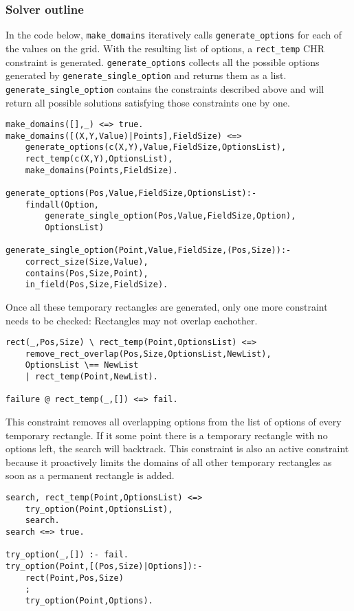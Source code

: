 \subsubsection{Solver outline}
In the code below,  \texttt{make\_domains} iteratively calls \texttt{generate\_options} for each of the values on the grid. With the resulting list of options, a \texttt{rect\_temp} CHR constraint is generated. \texttt{generate\_options} collects all the possible options generated by \texttt{generate\_single\_option} and returns them as a list. \texttt{generate\_single\_option} contains the constraints described above and will return all possible solutions satisfying those constraints one by one. 

\begin{lstlisting}
make_domains([],_) <=> true.
make_domains([(X,Y,Value)|Points],FieldSize) <=>
	generate_options(c(X,Y),Value,FieldSize,OptionsList),
	rect_temp(c(X,Y),OptionsList),
	make_domains(Points,FieldSize).
	
generate_options(Pos,Value,FieldSize,OptionsList):-
    findall(Option,
		generate_single_option(Pos,Value,FieldSize,Option),
		OptionsList)
		
generate_single_option(Point,Value,FieldSize,(Pos,Size)):-
	correct_size(Size,Value),
	contains(Pos,Size,Point),
	in_field(Pos,Size,FieldSize).
\end{lstlisting}

Once all these temporary rectangles are generated, only one more constraint needs to be checked: Rectangles may not overlap eachother.

\begin{lstlisting}
rect(_,Pos,Size) \ rect_temp(Point,OptionsList) <=>
	remove_rect_overlap(Pos,Size,OptionsList,NewList),
	OptionsList \== NewList
	| rect_temp(Point,NewList).
	
failure @ rect_temp(_,[]) <=> fail.

\end{lstlisting}


This constraint removes all overlapping options from the list of options of every temporary rectangle. If it some point there is a temporary rectangle with no options left, the search will backtrack. This constraint is also an active constraint because it proactively limits the domains of all other temporary rectangles as soon as a permanent rectangle is added.
\begin{lstlisting}
search, rect_temp(Point,OptionsList) <=>
	try_option(Point,OptionsList),
	search.
search <=> true.

try_option(_,[]) :- fail.
try_option(Point,[(Pos,Size)|Options]):-
    rect(Point,Pos,Size)
    ;
    try_option(Point,Options).
\end{lstlisting}

